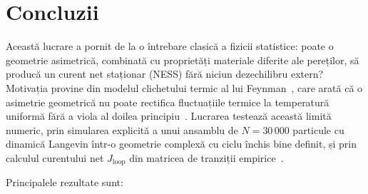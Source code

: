 \documentclass[12pt,openright,twoside]{book}
\begin{document}
\chapter{Concluzii}
\label{sec:concluzii}

Această lucrare a pornit de la o întrebare clasică a fizicii statistice: poate o geometrie asimetrică, combinată cu proprietăți materiale diferite ale pereților, să producă un curent net staționar (NESS) fără niciun dezechilibru extern? Motivația provine din modelul clichetului termic al lui Feynman~\cite{feynman1963}, care arată că o asimetrie geometrică nu poate rectifica fluctuațiile termice la temperatură uniformă fără a viola al doilea principiu~\cite{parrondo1996,reimann2002}. Lucrarea testează această limită numeric, prin simularea explicită a unui ansamblu de $N = 30\,000$ particule cu dinamică Langevin într-o geometrie complexă cu ciclu închis bine definit, și prin calculul curentului net $J_\text{loop}$ din matricea de tranziții empirice~\cite{jiang2004,maes2021}.

Principalele rezultate sunt:
\end{document}
